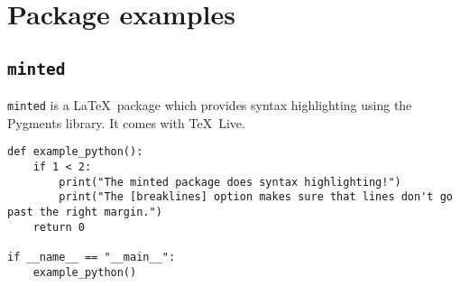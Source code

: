 \section{Package examples}
\subsection{\texttt{minted}}

\texttt{minted} is a \LaTeX\ package which provides syntax highlighting
using the Pygments library. It comes with \TeX\ Live.

\begin{verbatim}
def example_python():
    if 1 < 2:
        print("The minted package does syntax highlighting!")
        print("The [breaklines] option makes sure that lines don't go past the right margin.")
    return 0

if __name__ == "__main__":
    example_python()
\end{verbatim}

